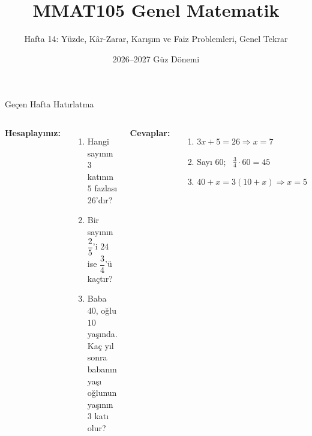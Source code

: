 \documentclass[aspectratio=169,11pt,handout]{beamer}
\title[MMAT105 -- Hafta 14]{MMAT105 Genel Matematik}
\subtitle{Hafta 14: Yüzde, Kâr-Zarar, Karışım ve Faiz Problemleri, Genel Tekrar}
\author{}
\date{2026--2027 Güz Dönemi}
\begin{document}
\begin{frame}
\titlepage
\end{frame}



\begin{frame}{Geçen Hafta Hatırlatma}
\begin{columns}[t]
\textbf{Hesaplayınız:}
\begin{enumerate}
\item Hangi sayının \(3\) katının \(5\) fazlası \(26\)'dır?
\item Bir sayının \(\dfrac{2}{5}\)'i \(24\) ise \(\dfrac{3}{4}\)'ü kaçtır?
\item Baba \(40\), oğlu \(10\) yaşında. Kaç yıl sonra babanın yaşı oğlunun yaşının \(3\) katı olur?
\end{enumerate}
\pause
\textbf{Cevaplar:}
\begin{enumerate}
\item \(3x+5=26\Rightarrow x=7\)
\item Sayı \(60\); \ \(\tfrac{3}{4}\cdot 60=45\)
\item \(40+x=3(10+x)\Rightarrow x=5\)
\end{enumerate}
\end{columns}
\end{frame}
\end{document}
